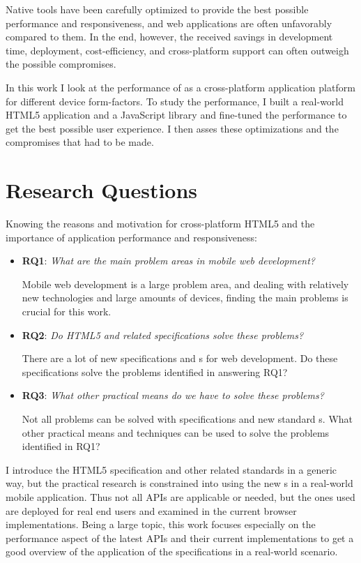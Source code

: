 Native tools have been carefully optimized to provide the best
possible performance and responsiveness, and web applications are
often unfavorably compared to them. In the end, however, the received
savings in development time, deployment, cost-efficiency, and
cross-platform support can often outweigh the possible
compromises. \cite{charland2011mobile, fling2009mobile}

In this work I look at the performance of  as a
cross-platform application platform for different device
form-factors. To study the performance, I built a real-world HTML5
application and a JavaScript library and fine-tuned the performance to
get the best possible user experience. I then asses these
optimizations and the compromises that had to be made.

\section{Research Questions}
\label{section:research-questions}

Knowing the reasons and motivation for cross-platform HTML5 and the
importance of application performance and responsiveness:

\begin{itemize}
\item \textbf{RQ1}: \textit{What are the main problem areas in mobile
  web development?}

  Mobile web development is a large problem area, and dealing with
  relatively new technologies and large amounts of devices, finding
  the main problems is crucial for this work.

\item \textbf{RQ2}: \textit{Do HTML5 and related specifications solve
  these problems?}

  There are a lot of new specifications and s for web
  development. Do these specifications solve the problems identified
  in answering RQ1?

\item \textbf{RQ3}: \textit{What other practical means do we have to
  solve these problems?}

  Not all problems can be solved with specifications and new standard
  s. What other practical means and techniques can be used
  to solve the problems identified in RQ1?

\end{itemize}

I introduce the HTML5 specification and other related standards in a
generic way, but the practical research is constrained into using the
new s in a real-world mobile application. Thus not all APIs
are applicable or needed, but the ones used are deployed for real end
users and examined in the current browser implementations. Being a
large topic, this work focuses especially on the performance aspect of
the latest APIs and their current implementations to get a good
overview of the application of the specifications in a real-world
scenario.

